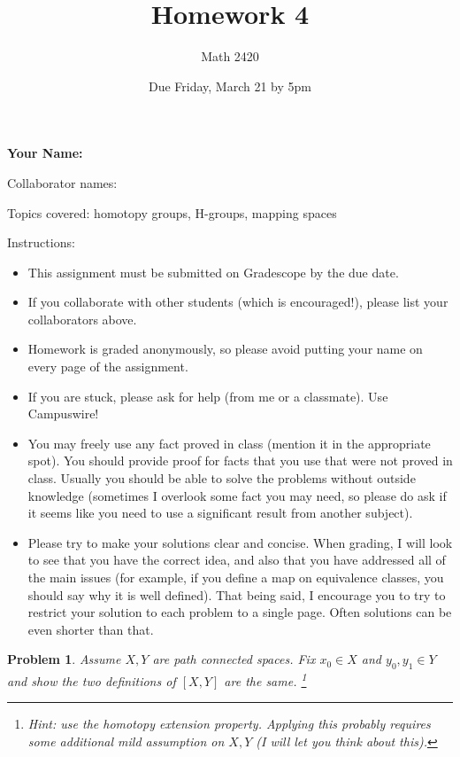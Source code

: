 \documentclass[11pt]{article}
\author{Math 2420}
\date{Due Friday, March 21 by 5pm}
\title{Homework 4}
\newtheorem{problem}{Problem}
\begin{document}
\maketitle

{\bf\Large Your Name:} 

Collaborator names: 


\vspace{.3in}
Topics covered: homotopy groups, H-groups, mapping spaces

Instructions: 
\begin{itemize}
\item This assignment must be submitted on Gradescope by the due date. 
\item If you collaborate with other students (which is encouraged!), please list your collaborators above. 
\item Homework is graded anonymously, so please avoid putting your name on every page of the assignment.
\item If you are stuck, please ask for help (from me or a classmate). Use Campuswire!  
\item You may freely use any fact proved in class (mention it in the appropriate spot). You should provide proof for facts that you use that were not proved in class. Usually you should be able to solve the problems without outside knowledge (sometimes I overlook some fact you may need, so please do ask if it seems like you need to use a significant result from another subject). 
\item Please try to make your solutions clear and concise. When grading, I will look to see that you have the correct idea, and also that you have addressed all of the main issues (for example, if you define a map on equivalence classes, you should say why it is well defined). That being said, I encourage you to try to restrict your solution to each problem to a single page. Often solutions can be even shorter than that. 
\end{itemize}
\pagebreak 



\pagebreak 
\begin{problem}
Assume $X,Y$ are path connected spaces. Fix $x_0\in X$ and $y_0,y_1\in Y$ and show the two definitions of $[X,Y]$ are the same. \footnote{Hint: use the homotopy extension property. Applying this probably requires some additional mild assumption on $X,Y$ (I will let you think about this).} 
\end{problem}
\end{document}

